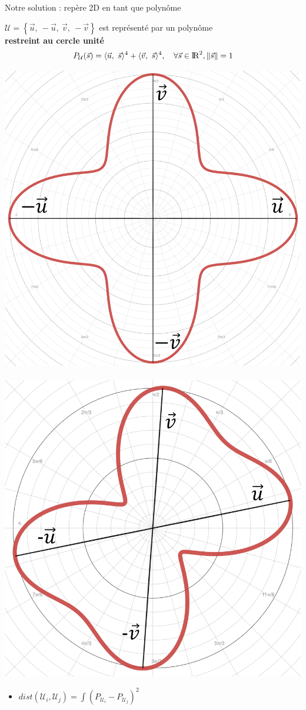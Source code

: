 \begin{frame}{Notre solution : repère 2D en tant que polynôme}
    \centering
    
$\mathcal{U} = \left\{\vec{u},\ -\vec{u},\ \vec{v},\ -\vec{v}\right\}$  est représenté par un polynôme \\
\textbf{restreint au cercle unité}
$$P_\mathcal{U}(\vec{s}) = \langle \vec{u},\ \vec{s}\rangle^{4} +  \langle \vec{v},\ \vec{s}\rangle^{4}, \ \ \   \forall \vec{s} \in {\rm I\!R}^2, \lVert \vec{s} \rVert = 1$$

     \includegraphics[width=0.3\linewidth]{img_spm_ff/anoted_orthogonal.PNG}
    \ \ \ 
       \includegraphics[width=0.3\linewidth]{img_spm_ff/anoted_polynome.PNG}
    \\
    
    \normalsize
    \begin{itemize}
     \item $dist(\mathcal{U}_i, \mathcal{U}_j) = \displaystyle\int (P_{\mathcal{U}_i} - P_{\mathcal{U}_j})^2$
    \end{itemize}
\end{frame}

